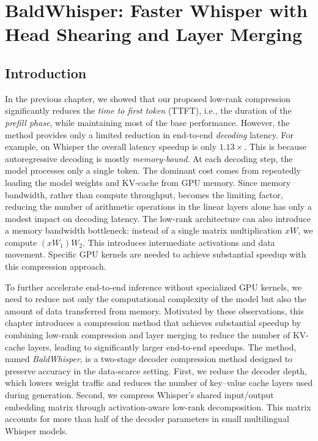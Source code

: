\chapter[BaldWhisper]{BaldWhisper: Faster Whisper with Head Shearing and Layer Merging}\label{ch:baldwhisper}

\section{Introduction}

In the previous chapter, we showed that our proposed low-rank compression significantly reduces the \textit{time to first token} (TTFT), i.e., the duration of the \textit{prefill phase}, while maintaining most of the base performance.
However, the method provides only a limited reduction in end-to-end \textit{decoding} latency. For example, on Whisper the overall latency speedup is only $1.13\times$.
This is because autoregressive decoding is mostly \textit{memory-bound}. At each decoding step, the model processes only a single token. The dominant cost comes from repeatedly loading the model weights and KV-cache from GPU memory.
Since memory bandwidth, rather than compute throughput, becomes the limiting factor, reducing the number of arithmetic operations in the linear layers alone has only a modest impact on decoding latency.
The low-rank architecture can also introduce a memory bandwidth bottleneck: instead of a single matrix multiplication $xW$, we compute $(xW_{1})W_{2}$.
This introduces intermediate activations and data movement. Specific GPU kernels
are needed to achieve substantial speedup with this compression approach.

To further accelerate end-to-end inference without specialized GPU kernels, we need to reduce not only the computational complexity of the model but also the amount of data transferred from memory.
Motivated by these observations, this chapter introduces a compression method that achieves substantial speedup by combining low-rank compression and layer merging to reduce the number of KV-cache layers,
leading to significantly larger end-to-end speedups. The method, named \emph{BaldWhisper}, is a two-stage decoder compression method designed to preserve accuracy in the data-scarce setting.
First, we reduce the decoder depth, which lowers weight traffic and reduces the number of key--value cache layers used during generation. Second, we compress Whisper's shared input/output embedding matrix through activation-aware low-rank decomposition.
This matrix accounts for more than half of the decoder parameters in small multilingual Whisper models.

